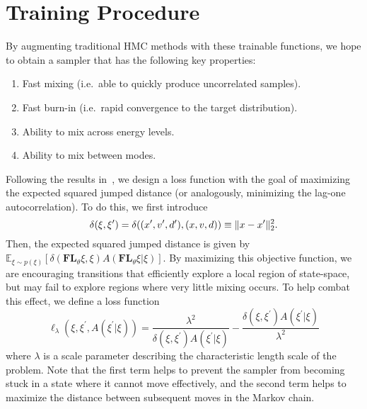 \documentclass[../main.tex]{subfiles}
\begin{document}
%
\section{Training Procedure}
%
By augmenting traditional HMC methods with these trainable functions, we hope
to obtain a sampler that has the following key properties:
%
\begin{enumerate}
    \item Fast mixing (i.e.\ able to quickly produce uncorrelated samples).
    \item Fast burn-in (i.e.\ rapid convergence to the target distribution).
    \item Ability to mix across energy levels.
    \item Ability to mix between modes.
\end{enumerate}
%
Following the results in~\cite{10.2307/24308995}, we design a loss function
with the goal of maximizing the expected squared jumped distance (or
analogously, minimizing the lag-one autocorrelation).
%
To do this, we first introduce 
\begin{equation}
  \delta(\xi, {\xi^{\prime}}) = \delta((x^{\prime}, v^{\prime}, d^{\prime}), (x, v, d))
  \equiv \| x - x^{\prime}\|^2_2.  \label{eq:metric_orig}
\end{equation}
%
Then, the expected squared jumped distance is given by $\mathbb{E}_{\xi\sim
p(\xi)} \left[\delta(\mathbf{FL}_{\theta}\xi, \xi) A(\mathbf{FL}_{\theta}\xi |
\xi)\right]$.
%
By maximizing this objective function, we are encouraging transitions that
efficiently explore a local region of state-space, but may fail to explore
regions where very little mixing occurs.
%
To help combat this effect, we define a loss function
%
\begin{equation}
    \ell_{\lambda}(\xi, \xi^{\prime}, A(\xi^{\prime}|\xi)) =
        \frac{\lambda^2}{\delta(\xi,\xi^{\prime}) A(\xi^{\prime}|\xi)} -
        \frac{\delta(\xi,\xi^{\prime}) A(\xi^{\prime}|\xi)}{\lambda^2}
    \label{eq:loss_ell}
\end{equation}
%
where $\lambda$ is a scale parameter describing the characteristic length scale
of the problem.
%
Note that the first term helps to prevent the sampler from becoming stuck in a
state where it cannot move effectively, and the second term helps to maximize
the distance between subsequent moves in the Markov chain.  
\end{document}
